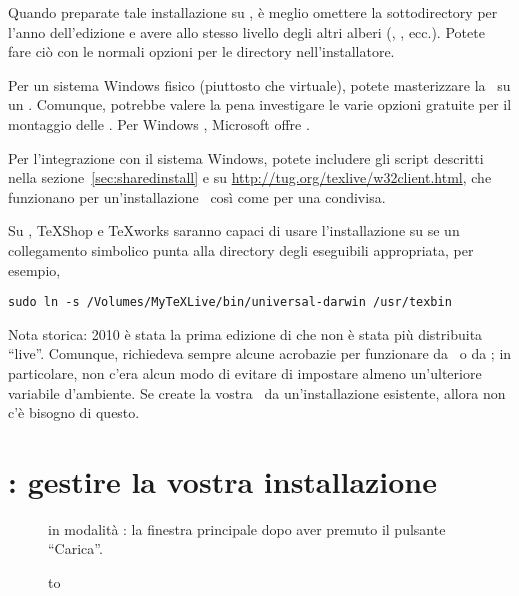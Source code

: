 \documentclass{article}
\begin{document}
Quando preparate tale installazione su \ISO, è meglio omettere la
sottodirectory per l'anno dell'edizione e avere  allo
stesso livello degli altri alberi (, ,
ecc.). Potete fare ciò con le normali opzioni per le directory
nell'installatore.

Per un sistema Windows fisico (piuttosto che virtuale), potete masterizzare
la \ISO\ su un . Comunque, potrebbe valere la pena investigare le
varie opzioni gratuite per il montaggio delle \ISO. Per Windows ,
Microsoft offre .

Per l'integrazione con il sistema Windows, potete includere gli script
 descritti nella sezione~\ref{sec:sharedinstall} e su
\url{http://tug.org/texlive/w32client.html}, che funzionano per
un'installazione \ISO\ così come per una condivisa.

Su \MacOSX, TeXShop e \TeX{}works saranno capaci di usare l'installazione su
 se un collegamento simbolico  punta alla
directory degli eseguibili appropriata, per esempio,
\begin{verbatim}
sudo ln -s /Volumes/MyTeXLive/bin/universal-darwin /usr/texbin
\end{verbatim}

Nota storica: \TL{} 2010 è stata la prima edizione di \TL{} che non è stata
più distribuita ``live''. Comunque, richiedeva sempre alcune acrobazie per
funzionare da \DVD\ o da \ISO; in particolare, non c'era alcun modo di
evitare di impostare almeno un'ulteriore variabile d'ambiente. Se create la
vostra \ISO\ da un'installazione esistente, allora non c'è bisogno di
questo.


\section{: gestire la vostra installazione}
\label{sec:tlmgr}

\begin{figure}[tb]
\caption{ in modalità \GUI: la finestra principale dopo aver
  premuto il pulsante ``Carica''.}\label{fig:tlmgr-gui}
\end{figure}

\begin{figure}[tb]
\hbox to 
\end{figure}
\end{document}
